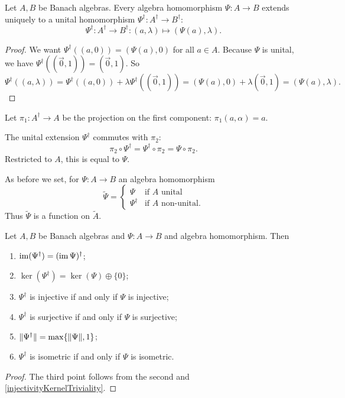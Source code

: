 \begin{lemma}
Let $A,B$ be Banach algebras. Every algebra homomorphism $\Psi:A\to B$ extends uniquely to a unital homomorphism $\Psi^\dagger: A^\dagger \to B^\dagger$:
\[ \Psi^\dagger: A^\dagger \to B^\dagger: (a,\lambda) \mapsto (\Psi(a),\lambda). \]
\end{lemma}
\begin{proof}
We want $\Psi^\dagger((a,0)) = (\Psi(a),0)$ for all $a\in A$. Because $\Psi$ is unital, we have $\Psi^\dagger((\vec{0},1)) = (\vec{0},1)$. So
\[ \Psi^\dagger((a,\lambda)) = \Psi^\dagger((a,0))+\lambda \Psi^\dagger((\vec{0},1)) = (\Psi(a),0) + \lambda(\vec{0},1) = (\Psi(a),\lambda). \]
\end{proof}
\begin{corollary} \label{projectionOnACommutes}
Let $\pi_1: A^\dagger \to A$ be the projection on the first component: $\pi_1(a,\alpha) = a$.

The unital extension $\Psi^\dagger$ commutes with $\pi_2$:
\[ \pi_2\circ\Psi^\dagger = \Psi^\dagger \circ \pi_2 = \Psi\circ \pi_2. \]
Restricted to $A$, this is equal to $\Psi$.
\end{corollary}
As before we set, for $\Psi: A \to B$ an algebra homomorphism
\[ \tilde{\Psi} = \begin{cases}
\Psi & \text{if $A$ unital} \\
\Psi^\dagger & \text{if $A$ non-unital.}
\end{cases} \]
Thus $\tilde{\Psi}$ is a function on $\tilde{A}$.

\begin{lemma} \label{DaggerMorphismProperties}
Let $A,B$ be Banach algebras and $\Psi:A\to B$ and algebra homomorphism. Then
\begin{enumerate}
\item $\operatorname{im}(\Psi^\dagger) = (\operatorname{im}\Psi)^\dagger$;
\item $\ker(\Psi^\dagger) = \ker(\Psi)\oplus\{0\}$;
\item $\Psi^\dagger$ is injective \textup{if and only if} $\Psi$ is injective;
\item $\Psi^\dagger$ is surjective \textup{if and only if} $\Psi$ is surjective;
\item $\lVert\Psi^\dagger\rVert = \max\{\lVert\Psi\rVert,1\}$;
\item $\Psi^\dagger$ is isometric \textup{if and only if} $\Psi$ is isometric.
\end{enumerate}
\end{lemma}
\begin{proof}
The third point follows from the second and \ref{injectivityKernelTriviality}.
\end{proof}

